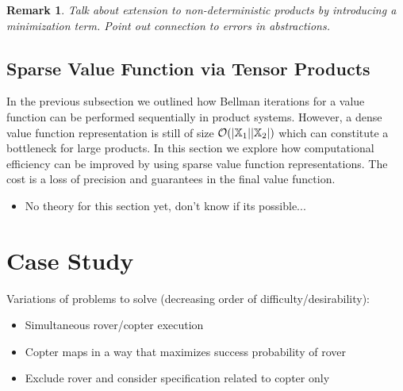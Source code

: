 \documentclass[conference]{IEEEtran}
\newtheorem{remark}{Remark}
\newcommand{\red}[1]{{\color{red} #1 }}
\begin{document}
\begin{remark}
  \red{Talk about extension to non-deterministic products by introducing a minimization term. Point out connection to errors in abstractions.} 
\end{remark}

\subsection{Sparse Value Function via Tensor Products}

In the previous subsection we outlined how Bellman iterations for a value function can be performed sequentially in product systems. However, a dense value function representation is still of size $\mathcal O (|\mathbb{X}_1| |\mathbb{X}_2|)$ which can constitute a bottleneck for large products. In this section we explore how computational efficiency can be improved by using sparse value function representations. The cost is a loss of precision and guarantees in the final value function.

\begin{itemize}
  \item \red{No theory for this section yet, don't know if its possible...}
\end{itemize}

\section{Case Study}

\red{Variations of problems to solve (decreasing order of difficulty/desirability):
\begin{itemize}
  \item Simultaneous rover/copter execution
  \item Copter maps in a way that maximizes success probability of rover
  \item Exclude rover and consider specification related to copter only
\end{itemize}}
\end{document}
